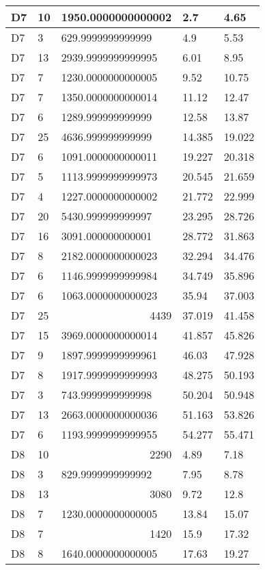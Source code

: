 \begin{longtable}{|l|l|l|l|l|}
D7 & 10 & 1950.0000000000002 & 2.7 & 4.65 \\ \hline
D7 & 3 & 629.9999999999999 & 4.9 & 5.53 \\ \hline
D7 & 13 & 2939.9999999999995 & 6.01 & 8.95 \\ \hline
D7 & 7 & 1230.0000000000005 & 9.52 & 10.75 \\ \hline
D7 & 7 & 1350.0000000000014 & 11.12 & 12.47 \\ \hline
D7 & 6 & 1289.999999999999 & 12.58 & 13.87 \\ \hline
D7 & 25 & 4636.999999999999 & 14.385 & 19.022 \\ \hline
D7 & 6 & 1091.0000000000011 & 19.227 & 20.318 \\ \hline
D7 & 5 & 1113.9999999999973 & 20.545 & 21.659 \\ \hline
D7 & 4 & 1227.0000000000002 & 21.772 & 22.999 \\ \hline
D7 & 20 & 5430.999999999997 & 23.295 & 28.726 \\ \hline
D7 & 16 & 3091.000000000001 & 28.772 & 31.863 \\ \hline
D7 & 8 & 2182.0000000000023 & 32.294 & 34.476 \\ \hline
D7 & 6 & 1146.9999999999984 & 34.749 & 35.896 \\ \hline
D7 & 6 & 1063.0000000000023 & 35.94 & 37.003 \\ \hline
D7 & 25 & \multicolumn{1}{r|}{4439} & 37.019 & 41.458 \\ \hline
D7 & 15 & 3969.0000000000014 & 41.857 & 45.826 \\ \hline
D7 & 9 & 1897.9999999999961 & 46.03 & 47.928 \\ \hline
D7 & 8 & 1917.9999999999993 & 48.275 & 50.193 \\ \hline
D7 & 3 & 743.9999999999998 & 50.204 & 50.948 \\ \hline
D7 & 13 & 2663.0000000000036 & 51.163 & 53.826 \\ \hline
D7 & 6 & 1193.9999999999955 & 54.277 & 55.471 \\ \hline
D8 & 10 & \multicolumn{1}{r|}{2290} & 4.89 & 7.18 \\ \hline
D8 & 3 & 829.9999999999992 & 7.95 & 8.78 \\ \hline
D8 & 13 & \multicolumn{1}{r|}{3080} & 9.72 & 12.8 \\ \hline
D8 & 7 & 1230.0000000000005 & 13.84 & 15.07 \\ \hline
D8 & 7 & \multicolumn{1}{r|}{1420} & 15.9 & 17.32 \\ \hline
D8 & 8 & 1640.0000000000005 & 17.63 & 19.27 \\ \hline

\end{longtable}
